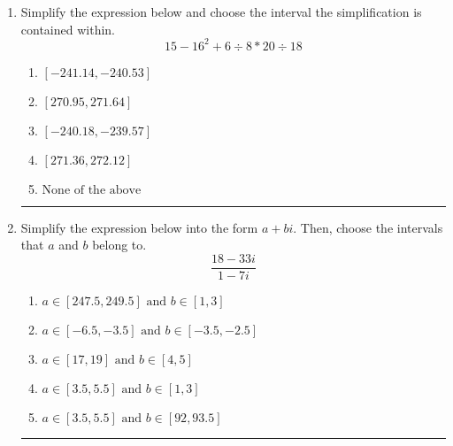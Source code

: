 \documentclass[14pt]{extbook}
\newcommand{\litem}[1]{\item#1\hspace*{-1cm}\rule{\textwidth}{0.4pt}}
\begin{document}
\begin{enumerate}
{\begin{enumerate}[label=\Alph*.]
\end{enumerate} }
\litem{
Simplify the expression below and choose the interval the simplification is contained within.\[ 15 - 16^2 + 6 \div 8 * 20 \div 18 \]\begin{enumerate}[label=\Alph*.]
\item \( [-241.14, -240.53] \)
\item \( [270.95, 271.64] \)
\item \( [-240.18, -239.57] \)
\item \( [271.36, 272.12] \)
\item \( \text{None of the above} \)

\end{enumerate} }
\litem{
Simplify the expression below into the form $a+bi$. Then, choose the intervals that $a$ and $b$ belong to.\[ \frac{18 - 33 i}{1 - 7 i} \]\begin{enumerate}[label=\Alph*.]
\item \( a \in [247.5, 249.5] \text{ and } b \in [1, 3] \)
\item \( a \in [-6.5, -3.5] \text{ and } b \in [-3.5, -2.5] \)
\item \( a \in [17, 19] \text{ and } b \in [4, 5] \)
\item \( a \in [3.5, 5.5] \text{ and } b \in [1, 3] \)
\item \( a \in [3.5, 5.5] \text{ and } b \in [92, 93.5] \)

\end{enumerate} }
\end{enumerate}
\end{document}
